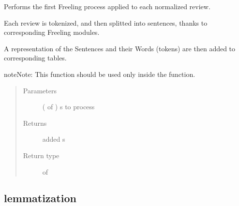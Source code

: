 \documentclass[letterpaper,10pt,english]{sphinxmanual}
\begin{document}
\begin{fulllineitems}
\label{\detokenize{index:loacore.process.sentence_process.add_sentences_from_reviews}}
Performs the first Freeling process applied to each normalized review.

Each review is tokenized, and then splitted into sentences, thanks to corresponding Freeling modules.

A representation of the Sentences and their Words (tokens) are then added to corresponding tables.

\begin{sphinxadmonition}{note}{Note:}
This function should be used only inside the  function.
\end{sphinxadmonition}
\begin{quote}\begin{description}
\item[{Parameters}] \leavevmode
{} ( of ) \textendash{}  s to process

\item[{Returns}] \leavevmode
added  s

\item[{Return type}] \leavevmode
{} of 

\end{description}\end{quote}

\end{fulllineitems}



\subsection{lemmatization}
\label{\detokenize{index:module-loacore.process.lemma_process}}\label{\detokenize{index:lemmatization}}
\end{document}
